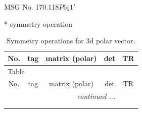 \documentclass[fleqn,8pt]{jsarticle}
\begin{document}
\setcounter{MaxMatrixCols}{32}

\renewcommand{\tablename}{Table~}
\renewcommand{\figurename}{Figure~}
\begin{center}
\LARGE
MSG No. 170.118\quad$P6_{5}1'$
\end{center}
* symmetry operation
\renewcommand{\arraystretch}{1.3}
\begin{longtable}{ccccc}
\caption{Symmetry operations for 3d polar vector.}
 \\
 \hline \hline
No. & tag & matrix (polar) & det & TR \\ \hline \endfirsthead

\multicolumn{4}{l}{\tablename\ \thetable{}} \\
 \hline \hline
No. & tag & matrix (polar) & det & TR \\ \hline \endhead

 \hline \hline
\multicolumn{4}{r}{\footnotesize\it continued ...} \\ \endfoot

 \hline \hline
\multicolumn{4}{r}{} \\ \endlastfoot


\end{longtable}
\end{document}

